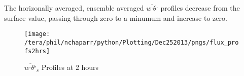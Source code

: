 The horizonally averaged, ensemble averaged $\overline{w^{,}\theta^{,}}$ profiles  decrease from the surface value, passing through zero to a minumum and increase to zero.

\begin{figure}[!ht]
    \centering
    \texttt{[image: /tera/phil/nchaparr/python/Plotting/Dec252013/pngs/flux\_profs2hrs]}
    \caption{$\overline{w^{,}\theta^{,}}_{s}$ Profiles at 2 hours}
    \label{fig:fluxprofs2hrs}   %
\end{figure}










